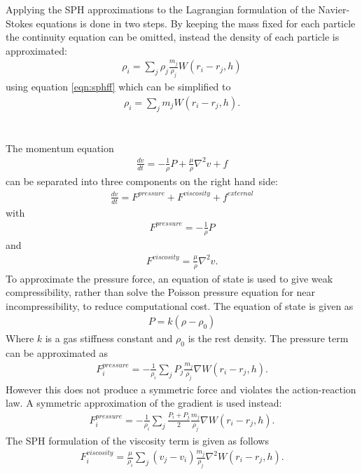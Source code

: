 Applying the SPH approximations to the Lagrangian formulation of the
Navier-Stokes equations is done in two steps. By keeping the mass fixed for each
particle the continuity equation can be omitted, instead the density of each particle is approximated:
\begin{align}
\rho_i = \sum_j \rho_j \frac{m_j}{\rho_j} W(r_i - r_j, h)
\end{align}
using equation \ref{eqn:sphff} which can be simplified to
\begin{align}
\label{eqn:sphdens}
\rho_i = \sum_j m_j W(r_i - r_j, h).
\end{align}
\\
\\
The momentum equation
\begin{align}
\frac{dv}{dt} = -\frac{1}{\rho}P + \frac{\mu}{\rho} \nabla^2 v + f
\end{align}
can be separated into three components on the right hand side:
\begin{align} \frac{dv}{dt} = F^{pressure} + F^{viscosity} + f^{external} \end{align}
with
\begin{align}
F^{pressure} = -\frac{1}{\rho}P
\end{align}
and
\begin{align}
F^{viscosity} = \frac{\mu}{\rho} \nabla^2 v.
\end{align}
To approximate the pressure force, an equation of state is used to give weak
compressibility, rather than solve the Poisson pressure equation for near
incompressibility, to reduce computational cost.
The equation of state is given as 
\begin{align}
P = k(\rho - \rho_0)
\end{align}
Where $k$ is a gas stiffness constant and $\rho_0$ is the rest density.
The pressure term can be approximated as
\begin{align}
F^{pressure}_i = -\frac{1}{\rho_i} \sum_j P_j \frac{m_j}{\rho_j} \nabla W(r_i - r_j, h).
\end{align}
However this does not produce a symmetric force and violates the action-reaction law. A symmetric approximation of the gradient is used instead:
\begin{align}
F^{pressure}_i = -\frac{1}{\rho_i} \sum_j \frac{P_i + P_j}{2} \frac{m_j}{\rho_j} \nabla W(r_i - r_j, h).
\end{align}
The SPH formulation of the viscosity term is given as follows
\begin{align}
F^{viscosity}_i = \frac{\mu}{\rho_i} \sum_j (v_j - v_i) \frac{m_j}{\rho_j} \nabla^2 W(r_i - r_j, h).
\end{align}


